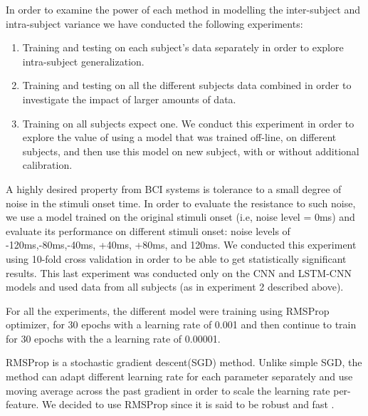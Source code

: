 \documentclass[
12pt, %
english, %
doublespacing, %
headsepline, %
]{MastersDoctoralThesis} %
\begin{document}
							
								
In order to examine the power of each method in modelling the inter-subject and  intra-subject variance we have conducted the following experiments:
\begin{enumerate}
	\item Training and testing on each subject's data separately in order to explore intra-subject generalization.
	\item Training and testing on all the different subjects data combined in order to investigate the impact of larger amounts of data.
	\item Training on all subjects expect one. We conduct this experiment in order to explore the value of using a model that was trained off-line, on different subjects, and then use this model on new subject, with or without additional calibration.
\end{enumerate}
									
A highly desired property from BCI systems is tolerance to a small degree of noise in the stimuli onset time.  In order to evaluate the resistance to such noise, we use a model trained on the original stimuli onset (i.e, noise level = 0ms) and evaluate its performance on different stimuli onset: noise levels of -120ms,-80ms,-40ms, +40ms, +80ms, and 120ms. We conducted this experiment using 10-fold cross validation in order to be able to get statistically significant results. This last experiment was conducted only on the CNN and LSTM-CNN models and used data from all subjects (as in experiment 2 described above).

For all the experiments, the different model were training using RMSProp~\cite{tieleman2012lecture} optimizer, for 30 epochs with a learning rate of 0.001 and then continue to train for 30 epochs with the a learning rate of 0.00001.


RMSProp \cite{tieleman2012lecture} is a stochastic gradient descent(SGD) method. Unlike simple SGD, the method can adapt different learning rate for each parameter separately and use moving average across the past gradient in order to scale the learning rate per-feature. We decided to use RMSProp since it is said to be robust and fast \cite{xu2015show, karpathy2015deep, szegedy2016rethinking}.
\end{document}
